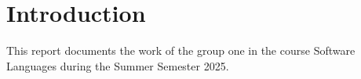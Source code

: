 \chapter{Introduction}

This report documents the work of the group one in the course Software Languages during the Summer Semester 2025. 

